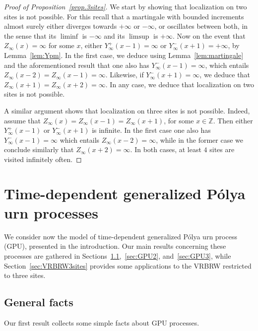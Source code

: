 \documentclass[11pt]{article}
\newcommand{\1}{{\text{\Large $\mathfrak 1$}}}
\begin{document}
\begin{proof}[Proof of Proposition~\ref{prop.3sites}]
We start by showing that localization on two sites is not possible. For this recall that a martingale with bounded increments almost surely  either diverges towards $+\infty$ or $-\infty$, or oscillates between both, in the sense that its $\liminf$ is $-\infty$ and its $\limsup$ is $+\infty$. Now on the event that $Z_\infty(x) = \infty$ for some $x$, either $Y_\infty^+(x-1)=\infty$ or $Y_\infty^-(x+1) = +\infty$, by Lemma~\ref{lem:Ypm}. In the first case, we deduce using Lemma~\ref{lem:martingale} and the aforementioned result that one also has $Y_\infty^-(x-1) = \infty$, which entails $Z_\infty(x-2) =Z_\infty(x-1)= \infty$. Likewise, if $Y_\infty^-(x+1) = \infty$, we deduce that $Z_\infty(x+1) = Z_\infty(x+2) = \infty$. In any case, we deduce that localization on two sites is not possible.  


A similar argument shows that localization on three sites is not possible. Indeed, assume that $Z_\infty(x) = Z_\infty(x-1) = Z_\infty(x+1)$, for some $x\in \mathbb Z$. Then either $Y_\infty^+(x-1)$ or $Y_\infty^-(x+1)$ is infinite. In the first case one also has $Y_\infty^-(x-1) = \infty$ which entails $Z_\infty(x-2) = \infty$, while in the former case we conclude similarly that $Z_\infty(x+2) = \infty$. In both cases, at least $4$ sites are visited infinitely often.   
\end{proof}




\section{Time-dependent generalized P\'olya urn processes} \label{sec:urns}
We consider now the model of time-dependent generalized P\'olya urn process (GPU), presented in the introduction. Our main results concerning these processes are gathered in 
Sections~\ref{sec:GPU},~\ref{sec:GPU2}, and~\ref{sec:GPU3}, while Section~\ref{sec:VRBRW3sites} provides some applications to the VRBRW restricted to three sites.  


\subsection{General facts} \label{sec:GPU}
Our first result collects some simple facts about GPU processes. 
\end{document}
